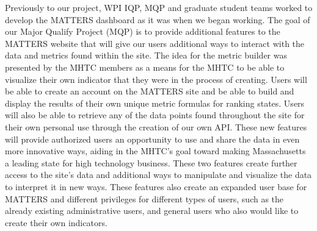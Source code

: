 Previously to our project, WPI IQP, MQP and graduate student teams worked to develop the MATTERS dashboard as it was when we began working. The goal of our Major Qualify Project (MQP) is to provide additional features to the MATTERS website that will give our users additional ways to interact with the data and metrics found within the site. The idea for the metric builder was presented by the MHTC members as a means for the MHTC to be able to visualize their own indicator that they were in the process of creating. Users will be able to create an account on the MATTERS site and be able to build and display the results of their own unique metric formulas for ranking states. Users will also be able to retrieve any of the data points found throughout the site for their own personal use through the creation of our own API. These new features will provide authorized users an opportunity to use and share the data in even more innovative ways, aiding in the MHTC’s goal toward making Massachusetts a leading state for high technology business. These two features create further access to the site’s data and additional ways to manipulate and visualize the data to interpret it in new ways. These features also create an expanded user base for MATTERS and different privileges for different types of users, such as the already existing administrative users, and general users who also would like to create their own indicators.